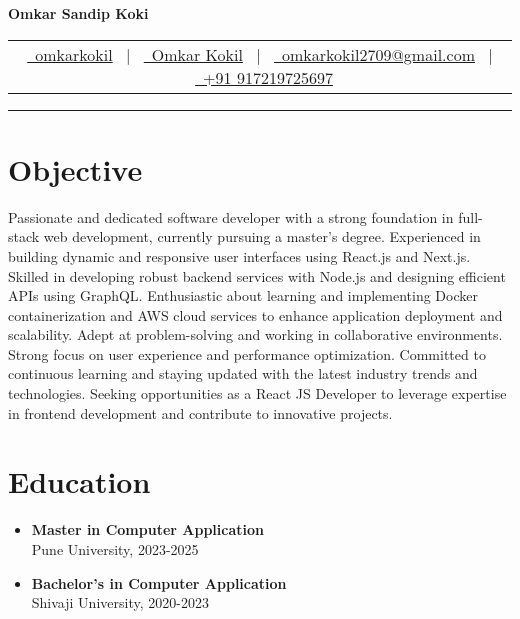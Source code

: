 \documentclass[a4paper,11pt]{article}
\begin{document}
\begin{center}
    \Huge{\textbf{Omkar Sandip Koki}} \\[10pt]
    \normalsize
    \begin{tabular}{c}
        \href{https://github.com/omkarkokil}{\raisebox{-0.2\height}{\small\faGithub}\ omkarkokil} \ $|$ \ 
        \href{https://www.linkedin.com/in/omkar-kokil-384231285/}{\raisebox{-0.2\height}{\small\faLinkedin}\ Omkar Kokil} \ $|$ \ 
        \href{mailto:omkarkokil2709@gmail.com}{\raisebox{-0.2\height}{\small\faEnvelope}\ omkarkokil2709@gmail.com} \ $|$ \ 
        \href{tel:+91917219725697}{\raisebox{-0.2\height}{\small\faMobile}\ +91 917219725697}
    \end{tabular}
\end{center}

\vspace{0.5em}
\hrule
\vspace{1em}

\section*{Objective}
Passionate and dedicated software developer with a strong foundation in full-stack web development, currently pursuing a master’s degree. Experienced in building dynamic and responsive user interfaces using React.js and Next.js. Skilled in developing robust backend services with Node.js and designing efficient APIs using GraphQL. Enthusiastic about learning and implementing Docker containerization and AWS cloud services to enhance application deployment and scalability. Adept at problem-solving and working in collaborative environments. Strong focus on user experience and performance optimization. Committed to continuous learning and staying updated with the latest industry trends and technologies. Seeking opportunities as a React JS Developer to leverage expertise in frontend development and contribute to innovative projects.

\section*{Education}
\begin{itemize}[leftmargin=*]
    \item \textbf{Master in Computer Application} \\
    Pune University, 2023-2025
    \item \textbf{Bachelor’s in Computer Application} \\
    Shivaji University, 2020-2023
\end{itemize}
\end{document}
